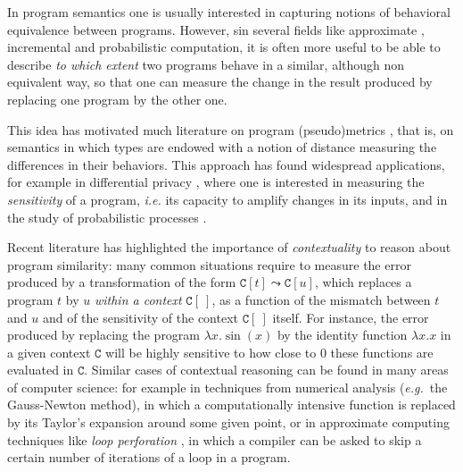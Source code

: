 
In program semantics one is usually interested in capturing notions of behavioral equivalence between programs. However,  sin several fields like approximate \cite{Mittal2016}, incremental \cite{Cai2014, Picallo2019} and probabilistic \cite{10.1109/LICS.2015.64} computation, it is often more useful to be able to describe \emph{to which extent}  two programs behave in a similar, although non equivalent way, so that one can measure the change in the result produced by
replacing one program by the other one.



This idea has motivated much literature on program (pseudo)metrics \cite{ARNOLD1980181, VANBREUGEL20011,Azevedo_de_Amorim_2017, Escardo1999, BAIER1994171,10.1109/LICS.2015.64, 10.1007/978-3-662-44584-6_4, 10.1007/978-3-662-54434-1_13, 10.1145/3209108.3209149}, that is, on semantics in which types are endowed with a notion of distance measuring the differences in their behaviors. This approach has found widespread applications, for example in differential privacy \cite{10.1145/1932681.1863568, 10.1007/978-3-642-29420-4_3, Barthe_2012}, where one is interested in measuring the \emph{sensitivity} of a program, \textit{i.e.} its capacity to amplify changes in its inputs, and in the study of probabilistic processes \cite{DESHARNAIS2004323, VANBREUGEL2005115, 10.1007/978-3-662-44584-6_4,10.1007/3-540-48224-5_35}.


Recent literature \cite{chaudhuri, dallago:differential-stlc} has highlighted the importance of \emph{contextuality} to reason about program similarity: many common situations  require to measure the error produced by a transformation of the form $\mathtt C[t] \leadsto \mathtt C[u]$, which replaces a program $t$ by $u$ \emph{within a context} $\mathtt C[\ ]$, as a function of the mismatch between $t$ and $u$ and of the sensitivity of the context $\mathtt C[\ ]$ itself.
 For instance, the error produced by replacing the program $\lambda x.\sin(x)$ by the identity function $\lambda x.x$
  in a given context  $\mathtt C$ will 
  be highly sensitive to how close to $0$  
  these functions are evaluated in $\mathtt C$.
 Similar cases of contextual reasoning can be found  in many areas of computer science: for example 
 in techniques from numerical analysis (\emph{e.g.}~the Gauss-Newton method), in which a 
 computationally intensive function is replaced by its Taylor's expansion {around some given point}, or in {approximate computing} techniques like \emph{loop perforation} \cite{loopperf}, in which a compiler can be asked to skip a certain number of iterations of a loop in a program.

